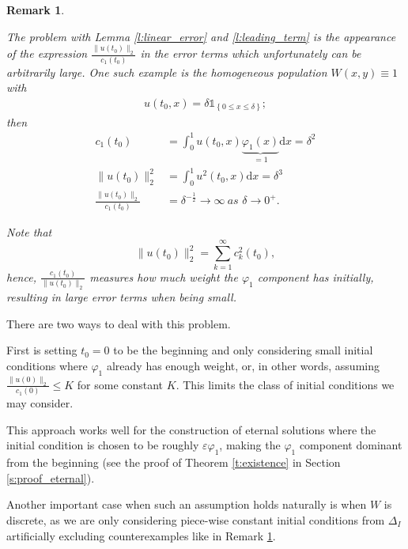 \documentclass{article}
\renewcommand{\d}{\mathrm{d}}
\newcommand{\1}[1]{{\mathds{1}}_{\left\{#1\right\}}}
\newtheorem{remark}{Remark}
\begin{document}
\begin{remark}
\label{r:counter_example}

The problem with Lemma \ref{l:linear_error} and \ref{l:leading_term} is the appearance of the expression $\frac{\|u(t_0) \|_2}{c_1(t_0)}$ in the error terms which unfortunately can be arbitrarily large. One such example is the homogeneous population $W(x,y) \equiv 1$ with 
\begin{align}
\label{eq:intial_conentration}
u(t_0,x)=\delta \1{0 \leq x \leq \delta};
\end{align}
then
\begin{align*}
c_1(t_0)&=\int_{0}^{1} u(t_0,x)\underbrace{\varphi_1(x)}_{=1} \d x=\delta^2 \\
\|u(t_0) \|_2^2&=\int_{0}^{1}u^2(t_0,x) \d x= \delta^3 \\
\frac{\|u(t_0) \|_2}{c_1(t_0)}&=\delta^{-\frac{1}{2}} \to \infty \ \textit{as } \delta \to 0^+.
\end{align*} 

Note that
$$\|u(t_0) \|_2^2=\sum_{k=1}^{\infty}c_k^2(t_0), $$
hence, $\frac{c_1(t_0)}{\|u(t_0) \|_2}$ measures how much weight the $\varphi_1$ component has initially, resulting in large error terms when being small.
\end{remark}

There are two ways to deal with this problem.

First is setting $t_0=0$ to be the beginning and only considering small initial conditions where $\varphi_1$ already has enough weight, or, in other words, assuming $\frac{\| u(0)\|_2}{c_1(0)} \leq K$ for some constant $K$. This limits the class of initial conditions we may consider.

This approach works well for the construction of eternal solutions where the initial condition is chosen to be roughly $\varepsilon \varphi_1$, making the $\varphi_1$ component dominant from the beginning (see the proof of Theorem \ref{t:existence} in Section \ref{s:proof_eternal}).

Another important case when such an assumption holds naturally is when $W$ is discrete, as we are only considering piece-wise constant initial conditions from $\Delta_I$ artificially excluding counterexamples like in Remark \ref{r:counter_example}. 
\end{document}
